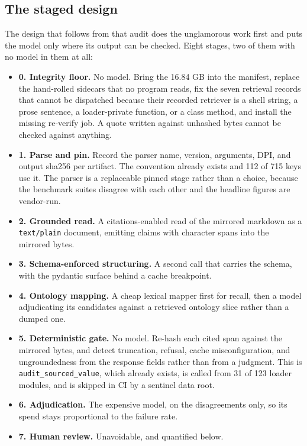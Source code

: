 \subsection{The staged design}\label{sec:pipeline-stages}

The design that follows from that audit does the unglamorous work first and puts the model only
where its output can be checked. Eight stages, two of them with no model in them at all:

\begin{itemize}[leftmargin=1.2em,itemsep=1pt,topsep=2pt]
  \item \textbf{0. Integrity floor.} No model. Bring the 16.84 GB into the manifest, replace the
    hand-rolled sidecars that no program reads, fix the seven retrieval records that cannot be
    dispatched because their recorded retriever is a shell string, a prose sentence, a
    loader-private function, or a class method, and install the missing re-verify job. A quote
    written against unhashed bytes cannot be checked against anything.
  \item \textbf{1. Parse and pin.} Record the parser name, version, arguments, DPI, and output
    sha256 per artifact. The convention already exists and 112 of 715 keys use it. The parser is
    a replaceable pinned stage rather than a choice, because the benchmark suites disagree with
    each other and the headline figures are vendor-run.
  \item \textbf{2. Grounded read.} A citations-enabled read of the mirrored markdown as a
    \texttt{text/plain} document, emitting claims with character spans into the mirrored bytes.
  \item \textbf{3. Schema-enforced structuring.} A second call that carries the schema, with the
    pydantic surface behind a cache breakpoint.
  \item \textbf{4. Ontology mapping.} A cheap lexical mapper first for recall, then a model
    adjudicating its candidates against a retrieved ontology slice rather than a dumped one.
  \item \textbf{5. Deterministic gate.} No model. Re-hash each cited span against the mirrored
    bytes, and detect truncation, refusal, cache misconfiguration, and ungroundedness from the
    response fields rather than from a judgment. This is \texttt{audit\_sourced\_value}, which
    already exists, is called from 31 of 123 loader modules, and is skipped in CI by a sentinel
    data root.
  \item \textbf{6. Adjudication.} The expensive model, on the disagreements only, so its spend
    stays proportional to the failure rate.
  \item \textbf{7. Human review.} Unavoidable, and quantified below.
\end{itemize}

